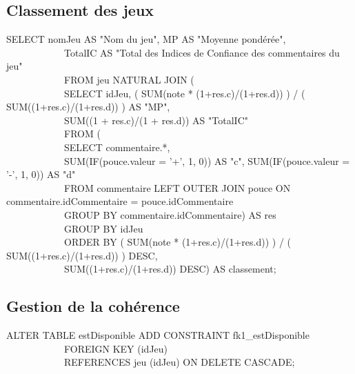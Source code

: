 \documentclass{beamer}
\begin{document}
\subsection{Classement des jeux}
\begin{frame}
\begin{center}
SELECT nomJeu AS "Nom du jeu", MP AS "Moyenne pondérée", \\
\ \ \ \ \ \ \ \ \ \ \ \        TotalIC AS "Total des Indices de Confiance des commentaires du jeu" \\
\ \ \ \ \ \ \ \ \ \ \ \ FROM jeu NATURAL JOIN ( \\
\ \ \ \ \ \ \ \ \ \ \ \   SELECT idJeu, ( SUM(note * (1+res.c)/(1+res.d)) ) / ( SUM((1+res.c)/(1+res.d)) ) AS "MP", \\
\ \ \ \ \ \ \ \ \ \ \ \          SUM((1 + res.c)/(1 + res.d)) AS "TotalIC" \\
\ \ \ \ \ \ \ \ \ \ \ \   FROM ( \\
\ \ \ \ \ \ \ \ \ \ \ \      SELECT commentaire.*, \\
\ \ \ \ \ \ \ \ \ \ \ \             SUM(IF(pouce.valeur = '+', 1, 0)) AS "c", SUM(IF(pouce.valeur = '-', 1, 0)) AS "d" \\
\ \ \ \ \ \ \ \ \ \ \ \      FROM commentaire LEFT OUTER JOIN pouce ON commentaire.idCommentaire = pouce.idCommentaire \\
\ \ \ \ \ \ \ \ \ \ \ \      GROUP BY commentaire.idCommentaire) AS res \\
\ \ \ \ \ \ \ \ \ \ \ \   GROUP BY idJeu \\
\ \ \ \ \ \ \ \ \ \ \ \   ORDER BY ( SUM(note * (1+res.c)/(1+res.d)) ) / ( SUM((1+res.c)/(1+res.d)) ) DESC, \\
\ \ \ \ \ \ \ \ \ \ \ \            SUM((1+res.c)/(1+res.d)) DESC) AS classement; \\
\end{center}
\end{frame}

\subsection{Gestion de la cohérence}
\begin{frame}
ALTER TABLE estDisponible ADD CONSTRAINT fk1\_estDisponible \\
\ \ \ \ \ \ \ \ \ \ \ \ FOREIGN KEY (idJeu) \\
\ \ \ \ \ \ \ \ \ \ \ \ REFERENCES jeu (idJeu) ON DELETE CASCADE;
\end{frame}
\end{document}
